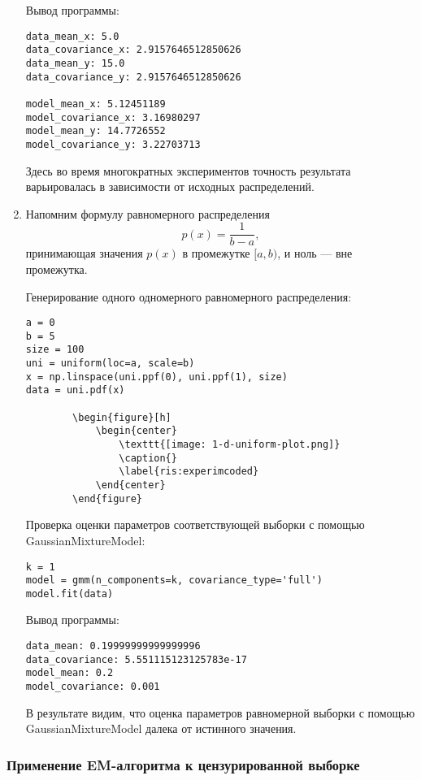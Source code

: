 \begin{enumerate}
{        Вывод программы:
        \begin{verbatim}
data_mean_x: 5.0
data_covariance_x: 2.9157646512850626
data_mean_y: 15.0
data_covariance_y: 2.9157646512850626

model_mean_x: 5.12451189
model_covariance_x: 3.16980297
model_mean_y: 14.7726552
model_covariance_y: 3.22703713
        \end{verbatim}

        Здесь во время многократных экспериментов точность результата варьировалась в зависимости от исходных распределений.
    }
    \item {
        Напомним формулу равномерного распределения
        $$p(x) = \frac{1}{b - a},$$
        принимающая значения $p(x)$ в промежутке $[a, b)$, и ноль --- вне промежутка.

        Генерирование одного одномерного равномерного распределения:
        \begin{verbatim}
a = 0
b = 5
size = 100
uni = uniform(loc=a, scale=b)
x = np.linspace(uni.ppf(0), uni.ppf(1), size)
data = uni.pdf(x)

        \begin{figure}[h]
            \begin{center}
                \texttt{[image: 1-d-uniform-plot.png]}
                \caption{}
                \label{ris:experimcoded}
            \end{center}
        \end{figure}
        \end{verbatim}

        Проверка оценки параметров соответствующей выборки с помощью GaussianMixtureModel:
        \begin{verbatim}
k = 1
model = gmm(n_components=k, covariance_type='full')
model.fit(data)
        \end{verbatim}

        Вывод программы:
        \begin{verbatim}
data_mean: 0.19999999999999996
data_covariance: 5.551115123125783e-17
model_mean: 0.2
model_covariance: 0.001
        \end{verbatim}

        В результате видим, что оценка параметров равномерной выборки с помощью GaussianMixtureModel далека от истинного значения.
    }
\end{enumerate}

\subsubsection{Применение EM-алгоритма к цензурированной выборке}

